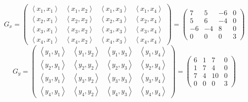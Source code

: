 \documentclass{article}
\begin{document}
    $$
        G_x = \begin{pmatrix}
            \left\langle x_1, x_1\right\rangle & \left\langle x_1, x_2\right\rangle & \left\langle x_1, x_3\right\rangle & \left\langle x_1, x_4\right\rangle \\
            \left\langle x_2, x_1\right\rangle & \left\langle x_2, x_2\right\rangle & \left\langle x_2, x_3\right\rangle & \left\langle x_2, x_4\right\rangle \\
            \left\langle x_3, x_1\right\rangle & \left\langle x_3, x_2\right\rangle & \left\langle x_3, x_3\right\rangle & \left\langle x_3, x_4\right\rangle \\
            \left\langle x_4, x_1\right\rangle & \left\langle x_4, x_2\right\rangle & \left\langle x_4, x_3\right\rangle & \left\langle x_4, x_4\right\rangle
        \end{pmatrix} = \begin{pmatrix}
            7  & 5  & -6 & 0 \\
            5  & 6  & -4 & 0 \\
            -6 & -4 & 8  & 0 \\
            0  & 0  & 0  & 3
        \end{pmatrix}
    $$$$
        G_y = \begin{pmatrix}
            \left\langle y_1, y_1\right\rangle & \left\langle y_1, y_2\right\rangle & \left\langle y_1, y_3\right\rangle & \left\langle y_1, y_4\right\rangle \\
            \left\langle y_2, y_1\right\rangle & \left\langle y_2, y_2\right\rangle & \left\langle y_2, y_3\right\rangle & \left\langle y_2, y_4\right\rangle \\
            \left\langle y_3, y_1\right\rangle & \left\langle y_3, y_2\right\rangle & \left\langle y_3, y_3\right\rangle & \left\langle y_3, y_4\right\rangle \\
            \left\langle y_4, y_1\right\rangle & \left\langle y_4, y_2\right\rangle & \left\langle y_4, y_3\right\rangle & \left\langle y_4, y_4\right\rangle
        \end{pmatrix} = \begin{pmatrix}
            6 & 1 & 7  & 0 \\
            1 & 7 & 4  & 0 \\
            7 & 4 & 10 & 0 \\
            0 & 0 & 0  & 3
        \end{pmatrix}
    $$
\end{document}
